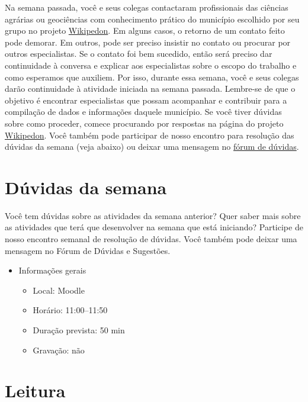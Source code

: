 \documentclass[
  11pt,
  a4paper,
  dvipsnames]{tufte-book}
\providecommand{\tightlist}{%
  \setlength{\itemsep}{0pt}\setlength{\parskip}{0pt}}
\begin{document}
Na semana passada, você e seus colegas contactaram profissionais das ciências agrárias ou geociências com conhecimento prático do município escolhido por seu grupo no projeto \href{https://pt.wikiversity.org/wiki/Wikipedon}{Wikipedon}. Em alguns casos, o retorno de um contato feito pode demorar. Em outros, pode ser preciso insistir no contato ou procurar por outros especialistas. Se o contato foi bem sucedido, então será preciso dar continuidade à conversa e explicar aos especialistas sobre o escopo do trabalho e como esperamos que auxiliem. Por isso, durante essa semana, você e seus colegas darão continuidade à atividade iniciada na semana passada. Lembre-se de que o objetivo é encontrar especialistas que possam acompanhar e contribuir para a compilação de dados e informações daquele município. Se você tiver dúvidas sobre como proceder, comece procurando por respostas na página do projeto \href{https://pt.wikiversity.org/wiki/Wikipedon}{Wikipedon}. Você também pode participar de nosso encontro para resolução das dúvidas da semana (veja abaixo) ou deixar uma mensagem no \href{https://moodle.utfpr.edu.br/mod/forum/view.php?id=573329}{fórum de dúvidas}.

\hypertarget{duxfavidas-da-semana-4}{%
\section{Dúvidas da semana}\label{duxfavidas-da-semana-4}}

Você tem dúvidas sobre as atividades da semana anterior? Quer saber mais sobre as atividades que terá que desenvolver na semana que está iniciando? Participe de nosso encontro semanal de resolução de dúvidas. Você também pode deixar uma mensagem no Fórum de Dúvidas e Sugestões.

\begin{itemize}
\tightlist
\item
  Informações gerais

  \begin{itemize}
  \tightlist
  \item
    Local: Moodle
  \item
    Horário: 11:00--11:50
  \item
    Duração prevista: 50 min
  \item
    Gravação: não
  \end{itemize}
\end{itemize}

\hypertarget{leitura-4}{%
\section{Leitura}\label{leitura-4}}
\end{document}
